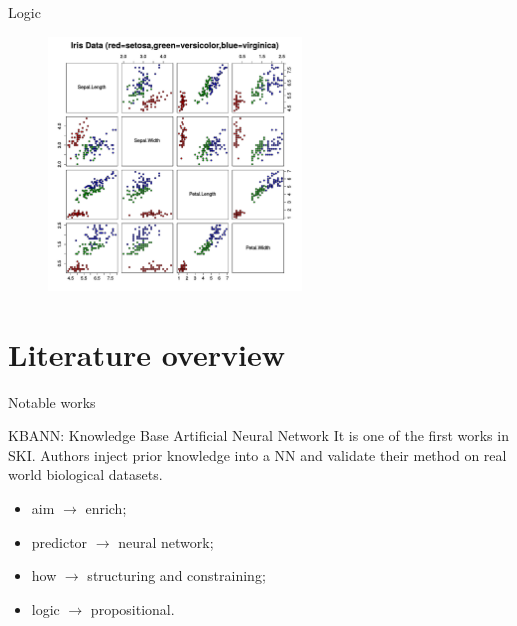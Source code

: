 \documentclass[presentation]{beamer}\mode<presentation>{\usetheme{AMSBolognaFC}}
\begin{document}
\begin{frame}[allowframebreaks]{Logic}
    \framebreak
    
    \begin{figure}
        \centering
        \includegraphics[width=0.6\textwidth]{figures/iris-dataset}
    \end{figure}

\end{frame}


\section{Literature overview}

\begin{frame}[c]{Notable works}
    \begin{block}{KBANN: Knowledge Base Artificial Neural Network }
        It is one of the first works in SKI.
        Authors inject prior knowledge into a NN and validate their method on real world biological datasets.
        \begin{itemize}
            \item aim $\rightarrow$ enrich;
            \item predictor $\rightarrow$ neural network;
            \item how $\rightarrow$ structuring and constraining;
            \item logic $\rightarrow$ propositional.
        \end{itemize}        
    \end{block}
\end{frame}
\end{document}
